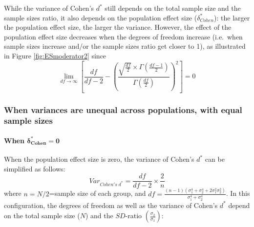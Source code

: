 \documentclass[
  english,
  man,mask]{apa6}
\let\oldparagraph\paragraph
\renewcommand{\paragraph}[1]{\oldparagraph{#1}\mbox{}}
\begin{document}
While the variance of Cohen's \(d^*\) still depends on the total sample size and the sample sizes ratio, it also depends on the population effect size (\(\delta^*_{Cohen}\)): the larger the population effect size, the larger the variance. However, the effect of the population effect size decreases when the degrees of freedom increase (i.e.~when sample sizes increase and/or the sample sizes ratio get closer to 1), as illustrated in Figure \ref{fig:ESmoderator2} since
\[\lim_{df\rightarrow \infty}\left[\frac{df}{df-2} - \left( \frac{\sqrt{\frac{df}{2}} \times \Gamma \left(\frac{df-1}{2} \right)}{\Gamma \left( \frac{df}{2}\right)}\right)^2 \right]=0\]

\hypertarget{when-variances-are-unequal-across-populations-with-equal-sample-sizes-1}{%
\subsubsection{When variances are unequal across populations, with equal sample sizes}\label{when-variances-are-unequal-across-populations-with-equal-sample-sizes-1}}

\hypertarget{when-bmdelta_cohen-0-1}{%
\paragraph{\texorpdfstring{When \(\bm{\delta^*_{Cohen} = 0}\)}{When \textbackslash bm\{\textbackslash delta\^{}*\_\{Cohen\} = 0\}}}\label{when-bmdelta_cohen-0-1}}

When the population effect size is zero, the variance of Cohen's \(d^*\) can be simplified as follows:
\[Var_{Cohen's \; d^*} = \frac{df}{df-2} \times \frac{2}{n}\]
where \(n=N/2\)=sample size of each group, and \(df=\frac{(n-1)(\sigma^4_1+\sigma^4_2+2\sigma^2_1\sigma^2_2)}{\sigma^4_1+\sigma^4_2}\). In this configuration, the degrees of freedom as well as the variance of Cohen's \(d^*\) depend on the total sample size (\(N\)) and the \(SD\)-ratio \(\left( \frac{\sigma_2}{\sigma_1}\right)\):
\end{document}
